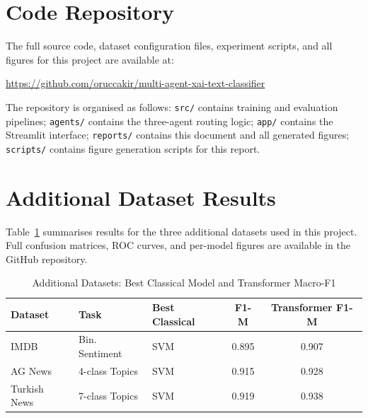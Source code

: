 \documentclass[conference]{IEEEtran}
\begin{document}
\appendix
\section{Code Repository}
\label{appendix:code}

The full source code, dataset configuration files, experiment scripts, and all figures
for this project are available at:

\begin{center}
  \href{https://github.com/oruccakir/multi-agent-xai-text-classifier}{https://github.com/oruccakir/multi-agent-xai-text-classifier}
\end{center}

The repository is organised as follows: \texttt{src/} contains training and evaluation
pipelines; \texttt{agents/} contains the three-agent routing logic; \texttt{app/}
contains the Streamlit interface; \texttt{reports/} contains this document and all
generated figures; \texttt{scripts/} contains figure generation scripts for this report.

\section{Additional Dataset Results}
\label{appendix:datasets}

Table~\ref{tab:appendix_summary} summarises results for the three additional datasets
used in this project. Full confusion matrices, ROC curves, and per-model figures are
available in the GitHub repository.

\begin{table}[htbp]
	\caption{Additional Datasets: Best Classical Model and Transformer Macro-F1}
	\label{tab:appendix_summary}
	\begin{center}
		\footnotesize
		\renewcommand{\arraystretch}{1.3}
		\setlength{\tabcolsep}{4pt}
		\begin{tabular}{lllcc}
			\toprule
			\rowcolor{headerblue}
			\color{white}\textbf{Dataset} & \color{white}\textbf{Task} & \color{white}\textbf{Best Classical} & \color{white}\textbf{F1-M} & \color{white}\textbf{Transformer F1-M} \\
			\midrule
			IMDB           & Bin. Sentiment & SVM    & 0.895 & 0.907 \\
			AG News        & 4-class Topics & SVM    & 0.915 & 0.928 \\
			Turkish News   & 7-class Topics & SVM    & 0.919 & 0.938 \\
			\bottomrule
		\end{tabular}
	\end{center}
\end{table}
\end{document}
